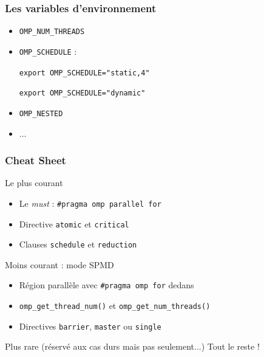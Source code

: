 \documentclass{beamer}
\begin{document}
\begin{frame}
  \frametitle{Les variables d'environnement}
  \begin{itemize}
  \item {\tt OMP\_NUM\_THREADS}
  \item {\tt OMP\_SCHEDULE} :

{\tt export OMP\_SCHEDULE="static,4"}

{\tt export OMP\_SCHEDULE="dynamic"}

    
      
      

  \item {\tt OMP\_NESTED} 

  \item ...
    
  \end{itemize}

  
\end{frame}


\begin{frame}[fragile]
  \frametitle{Cheat Sheet}

  \begin{exampleblock}{Le plus courant}
    \begin{itemize}
    \item Le \textit{must} : \verb|#pragma omp parallel for|
    \item Directive \verb|atomic| et \verb|critical|
    \item Clauses \verb|schedule| et \verb|reduction|
    \end{itemize}
  \end{exampleblock}

  \begin{block}{Moins courant : mode SPMD}
    \begin{itemize}
    \item Région parallèle avec \verb|#pragma omp for| dedans
    \item \verb|omp_get_thread_num()| et \verb|omp_get_num_threads()|
    \item Directives \verb|barrier|, \verb|master| ou \verb|single|
    \end{itemize}
  \end{block}

  \begin{alertblock}{Plus rare (réservé aux cas durs mais pas seulement...)}
    Tout le reste !
  \end{alertblock}
\end{frame}
\end{document}
